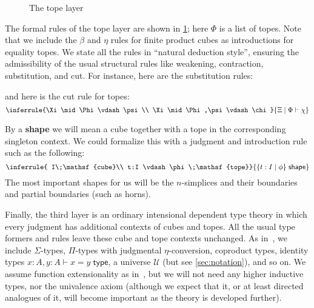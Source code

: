 \documentclass{amsart}
\theoremstyle{plain}
\theoremstyle{definition}
\theoremstyle{remark}
\numberwithin{equation}{section}
\newcommand{\jdeq}{\equiv}
\newcommand{\types}{\vdash}
\newcommand{\type}{\;\mathsf{type}}
\newcommand{\unittype}{\ensuremath{\mathbf{1}}}
\newcommand{\univtype}{\mathcal{U}}
\newcommand{\cube}{\;\mathsf{cube}}
\newcommand{\tope}{\;\mathsf{tope}}
\newcommand{\shape}{\;\mathsf{shape}}
\newcommand{\sh}[2]{\{#1\mid #2\}}
\newcommand{\pair}[1]{\langle #1\rangle}
\begin{document}
\begin{figure}
  \caption{The tope layer}
  \label{fig:topes}
\end{figure}

The formal rules of the tope layer are shown in \cref{fig:topes}; here $\Phi$ is a list of topes.
Note that we include the $\beta$ and $\eta$ rules for finite product cubes as introductions for equality topes.
We state all the rules in ``natural deduction style'', ensuring the admissibility of the usual structural rules like weakening, contraction, substitution, and cut.
For instance, here are the substitution rules:
and here is the cut rule for topes:
\[ \inferrule{\Xi\mid\Phi\types \psi \\ \Xi\mid\Phi,\psi\types\chi}{\Xi\mid \Phi\types \chi} \]

By a \textbf{shape} we will mean a cube together with a tope in the corresponding singleton context.
We could formalize this with a judgment and introduction rule such as the following:
\begin{equation}
  \inferrule{ I\cube \\ t:I \types \phi \tope}{\sh{t:I}{\phi} \shape}\label{eq:shape-judgment}
\end{equation}
The most important shapes for us will be the $n$-simplices and their boundaries and partial boundaries (such as horns).

Finally, the third layer is an ordinary intensional dependent type theory in which every judgment has additional contexts of cubes and topes.
All the usual type formers and rules leave these cube and tope contexts unchanged.
As in~\cite{hottbook}, we include $\Sigma$-types, $\Pi$-types with judgmental $\eta$-conversion, coproduct types, identity types $x : A, y : A \types x = y \type$, a universe $\univtype$ (but see \cref{sec:notation}), and so on.
We assume function extensionality as in~\cite[\S 2.9]{hottbook}, but we will not need any higher inductive types, nor the univalence axiom (although we expect that it, or at least directed analogues of it, will become important as the theory is developed further).
\end{document}
